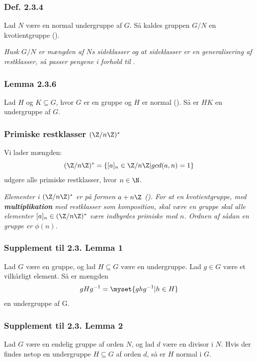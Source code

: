 \subsubsection{Def. 2.3.4}
Lad $N$ være en normal undergruppe af $G$. Så kaldes gruppen $G/N$ en
kvotientgruppe ().

\textit{Husk $G/N$ er mængden af $N$s sideklasser og at sideklasser er en
generalisering af restklasser, så passer pengene i forhold til
}.

\subsubsection{Lemma 2.3.6}
Lad $H$ og $K \subseteq G$, hvor $G$ er en gruppe og $H$ er normal
(). Så er $HK$ en undergruppe af $G$.

\subsubsection{Primiske restklasser $(\Z/n\Z)^*$}
\label{Primiske restklasser}
Vi lader mængden:
\begin{equation*}
  (\Z/n\Z)^* = \{[a]_n \in \Z/n\Z| gcd(a,n) = 1\}
\end{equation*}
udgøre alle primiske restklasser, hvor $n \in \N$.

\textit{Elementer i $(\Z/n\Z)^*$ er på formen $a + n\Z$ ().
For at en kvotientgruppe, med \textbf{multiplikation} med restklasser som
komposition, skal være en gruppe skal alle elementer $[a]_n \in (\Z/n\Z)^*$ være
indbyrdes primiske med $n$. Ordnen af sådan en gruppe er $\phi(n)$.}

\subsubsection{Supplement til 2.3. Lemma 1}
Lad $G$ være en gruppe, og lad $H \subseteq G$ være en undergruppe. Lad $g \in
G$ være et vilkårligt element. Så er mængden
\begin{equation*}
  gHg^{-1} = \myset{ghg^{-1} | h \in H}
\end{equation*} 
en undergruppe af G.

\subsubsection{Supplement til 2.3. Lemma 2}
Lad $G$ være en endelig gruppe af orden $N$, og lad $d$ være en divisor i $N$.
Hvis der findes netop en undergruppe $H \subseteq G$ af orden $d$, så er $H$
normal i $G$.


